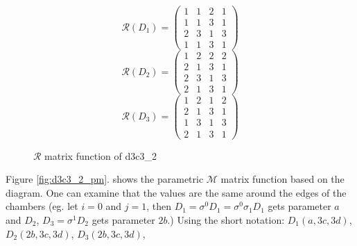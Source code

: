 \documentclass[12pt,a4paper]{article}
\theoremstyle{plain}%
\theoremstyle{definition}
\theoremstyle{remark}
\begin{document}
\begin{figure}
  \caption{\label{fig:d3c3_2_r} $\mathcal{R}$ matrix function of d3c3\_2}
  \begin{equation*}
    \mathcal{R}(D_1)=
    \left(
    \begin{array}{cccc}
      1 & 1 & 2 & 1\\
      1 & 1 & 3 & 1\\
      2 & 3 & 1 & 3\\
      1 & 1 & 3 & 1
    \end{array}
    \right)
  \end{equation*}
  \begin{equation*}
    \mathcal{R}(D_2)=
    \left(
    \begin{array}{cccc}
      1 & 2 & 2 & 2\\
      2 & 1 & 3 & 1\\
      2 & 3 & 1 & 3\\
      2 & 1 & 3 & 1
    \end{array}
    \right)
  \end{equation*}
  \begin{equation*}
    \mathcal{R}(D_3)=
    \left(
    \begin{array}{cccc}
      1 & 2 & 1 & 2\\
      2 & 1 & 3 & 1\\
      1 & 3 & 1 & 3\\
      2 & 1 & 3 & 1
    \end{array}
    \right)
  \end{equation*}
\end{figure}

Figure \ref{fig:d3c3_2_pm}. shows the parametric $\mathcal{M}$ matrix function
based on the diagram. One can examine that the values are the same around the
edges of the chambers (eg. let $i=0$ and $j=1$, then
$D_1=\sigma^0D_1=\sigma^0\sigma_1D_1$ gets parameter $a$ and $D_2$,
$D_3=\sigma^1D_2$ gets parameter $2b$.) Using the short notation:
$D_1(a,3c,3d)$, $D_2(2b,3c,3d)$, $D_3(2b,3c,3d)$, 
\end{document}
